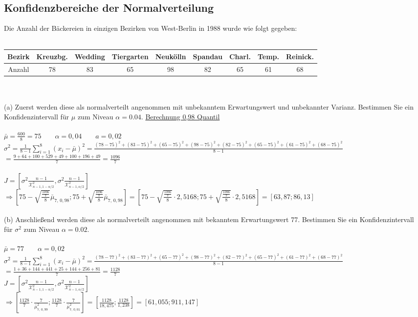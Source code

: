 \documentclass[a4paper]{article}
\begin{document}
\subsection{Konfidenzbereiche der Normalverteilung}
Die Anzahl der Bäckereien in einzigen Bezirken von West-Berlin in 1988 wurde wie folgt gegeben:\\\\
\begin{tabular}{c|c|c|c|c|c|c|c|c}
    Bezirk & Kreuzbg. & Wedding & Tiergarten & Neukölln & Spandau & Charl. & Temp. & Reinick. \\
    \hline
    Anzahl & 78 & 83 & 65 & 98 & 82 & 65 & 61 & 68 \\
\end{tabular}\\\\
(a) Zuerst werden diese als normalverteilt angenommen mit unbekanntem Erwartungswert und unbekannter Varianz. Bestimmen Sie ein Konfidenzintervall für $\mu$ zum Niveau $\alpha = 0.04$. \href{https://planetcalc.com/5017/}{Berechnung 0,98 Quantil}\\\\
\(\bar{\mu}= \frac{600}{8}=75\qquad \alpha = 0,04 \qquad a = 0,02\)\\
\(\sigma^2=\frac{1}{8-1}\sum\limits^8_{i=1}(x_i-\bar{\mu})^2 = \frac{(78-75)^2+(83-75)^2+(65-75)^2+(98-75)^2+(82-75)^2+(65-75)^2+(61-75)^2+(68-75)^2}{8-1}\)\\
\(= \frac{9+64+100+529+49+100+196+49}{7}=\frac{1096}{7}\)\\\\
\(J=\left[\sigma^2\frac{n-1}{\mathcal{X}^2_{n-1,1-\alpha/2}}, \sigma^2\frac{n-1}{\mathcal{X}^2_{n-1,\alpha/2}}\right]\)\\
\hspace*{0.3cm}\(\Rightarrow \left[75-\sqrt{\frac{\frac{1096}{7}}{8}}\bar{\mu}_{7,\, 0,98}; 75 + \sqrt{\frac{\frac{1096}{7}}{8}}\bar{\mu}_{7,\, 0,98}\right]= \left[75-\sqrt{\frac{\frac{1096}{7}}{8}}\cdot 2,5168; 75 + \sqrt{\frac{\frac{1096}{7}}{8}}\cdot 2,5168\right] = \left[63,87;86,13\right]\)\\\\
(b) Anschließend werden diese als normalverteilt angenommen mit bekanntem Erwartungswert 77. Bestimmen Sie ein Konfidenzintervall für $\sigma^2$ zum Niveau $\alpha = 0.02$.\\\\
\(\bar{\mu}=77 \qquad \alpha = 0,02\)\\
\(\sigma^2=\frac{1}{8-1}\sum\limits^8_{i=1}(x_i-\bar{\mu})^2 =\frac{(78-77)^2+(83-77)^2+(65-77)^2+(98-77)^2+(82-77)^2+(65-77)^2+(61-77)^2+(68-77)^2}{8-1}\)\\
\(=\frac{1+36+144+441+25+144+256+81}{7}=\frac{1128}{7}\)\\
\(J=\left[\sigma^2\frac{n-1}{\mathcal{X}^2_{n-1,1-\alpha/2}}, \sigma^2\frac{n-1}{\mathcal{X}^2_{n-1,\alpha/2}}\right]\)\\
\hspace*{0.3cm}\(\Rightarrow \left[\frac{1128}{7}\cdot \frac{7}{\bar{\mu}^2_{7,\,0,99}}; \frac{1128}{7}\cdot \frac{7}{\bar{\mu}^2_{7,\,0,01}}\right]=\left[\frac{1128}{18,475}; \frac{1128}{1,238}\right]=[61,055;911,147]\)\\\\
\end{document}
